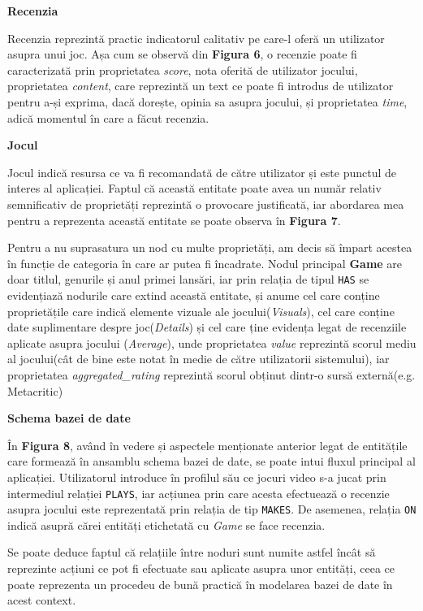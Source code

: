 \documentclass[12pt,a4paper]{report}
\begin{document}
\bigskip
\textbf{Recenzia}
\bigskip

Recenzia reprezintă practic indicatorul calitativ pe care-l oferă un utilizator asupra unui joc. Așa cum se observă din 
\textbf{Figura 6}, o recenzie poate fi caracterizată prin proprietatea \emph{score}, nota oferită de utilizator jocului, proprietatea \emph{content}, care reprezintă un text ce poate fi introdus de utilizator pentru a-și exprima, dacă dorește, opinia sa asupra jocului, și proprietatea \emph{time}, adică momentul în care a făcut recenzia.

\bigskip
\textbf{Jocul}
\bigskip

Jocul indică resursa ce va fi recomandată de către utilizator și este punctul de interes al aplicației. Faptul că această entitate poate avea un număr relativ semnificativ de proprietăți reprezintă o provocare justificată, iar abordarea mea pentru a reprezenta această entitate se poate observa în 
\textbf{Figura 7}.


Pentru a nu suprasatura un nod cu multe proprietăți, am decis să împart acestea în funcție de categoria în care ar putea fi încadrate. Nodul principal \textbf{Game} are doar titlul, genurile și anul primei lansări, iar prin relația de tipul \texttt{HAS} se evidențiază nodurile care extind această entitate, și anume cel care conține proprietățile care indică elemente vizuale ale jocului(\emph{Visuals}), cel care conține date suplimentare despre joc(\emph{Details}) și cel care ține evidența legat de recenziile aplicate asupra jocului (\emph{Average}), unde proprietatea \emph{value} reprezintă scorul mediu al jocului(cât de bine este notat în medie de către utilizatorii sistemului), iar proprietatea \emph{aggregated\_rating} reprezintă scorul obținut dintr-o sursă externă(e.g. Metacritic)

\bigskip
\textbf{Schema bazei de date}
\bigskip

În \textbf{Figura 8}, având în vedere și aspectele menționate anterior legat de entitățile care formează în ansamblu schema bazei de date, se poate intui fluxul principal al aplicației. Utilizatorul introduce în profilul său ce jocuri video s-a jucat prin intermediul relației \texttt{PLAYS}, iar acțiunea prin care acesta efectuează o recenzie asupra jocului este reprezentată prin relația de tip \texttt{MAKES}. De asemenea, relația \texttt{ON} indică asupră cărei entități etichetată cu \emph{Game} se face recenzia.

Se poate deduce faptul că relațiile între noduri sunt numite astfel încât să reprezinte acțiuni ce pot fi efectuate sau aplicate asupra unor entități, ceea ce poate reprezenta un procedeu de bună practică în modelarea bazei de date în acest context. \cite{11}
\end{document}
